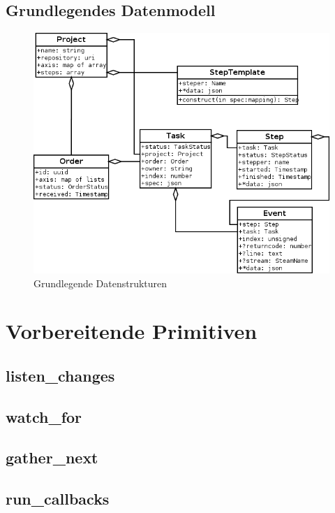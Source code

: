 \subsection{Grundlegendes Datenmodell}


\begin{figure}[ht] 
  \label{fig:datenstrukturen}
  \begin{center}
      \includegraphics[width=\textwidth]{imageinput/datenstrukturen-step-templates.png}
  \end{center}
  \caption{Grundlegende Datenstrukturen}
\end{figure}



\section{Vorbereitende Primitiven}

\subsection{listen\_changes}
\subsection{watch\_for}
\subsection{gather\_next}
\subsection{run\_callbacks}

